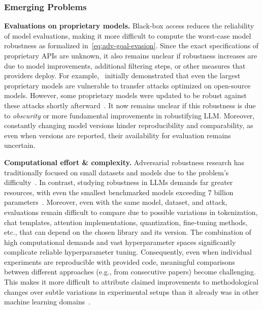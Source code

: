\subsubsection{Emerging Problems}
\textbf{Evaluations on proprietary models.} Black-box access reduces the reliability of model evaluations, making it more difficult to compute the worst-case model robustness as formalized in~\autoref{eq:adv-goal-evasion}. Since the exact specifications of proprietary APIs are unknown, it also remains unclear if robustness increases are due to model improvements, additional filtering steps, or other measures that providers deploy. For example,~\citet{zou2023universal} initially demonstrated that even the largest proprietary models are vulnerable to transfer attacks optimized on open-source models. However, some proprietary models were updated to be robust against these attacks shortly afterward~\cite{hurst2024gpt}. It now remains unclear if this robustness is due to \textit{obscurity} or more fundamental improvements in robustifying LLM. 
%
Moreover, constantly changing model versions hinder reproducibility and comparability, as even when versions are reported, their availability for evaluation remains uncertain.

\textbf{Computational effort \& complexity.} Adversarial robustness research has traditionally focused on small datasets and models due to the problem's difficulty~\cite{bartoldson2024adversarial}. In contrast, studying robustness in LLMs demands far greater resources, with even the smallest benchmarked models exceeding 7 billion parameters~\cite{xhonneux2024efficient, casper2024defending}. Moreover, even with the same model, dataset, and attack, evaluations remain difficult to compare due to possible variations in tokenization, chat templates, attention implementations, quantization, fine-tuning methods, etc., that can depend on the chosen library and its version. The combination of high computational demands and vast hyperparameter spaces significantly complicate reliable hyperparameter tuning. Consequently, even when individual experiments are reproducible with provided code, meaningful comparisons between different approaches (e.g., from consecutive papers) become challenging. This makes it more difficult to attribute claimed improvements to methodological changes over subtle variations in experimental setups than it already was in other machine learning domains~\cite{musgrave2020metric, qi2024evaluating}.

